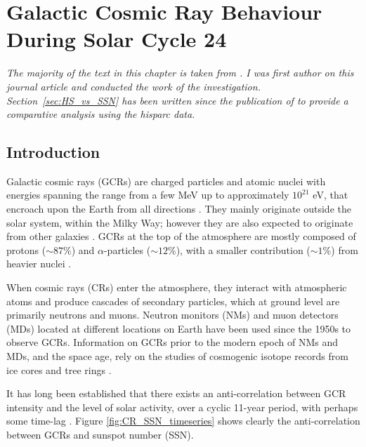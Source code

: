 \chapter{Galactic Cosmic Ray Behaviour During Solar Cycle 24}\label{chap:GCR_SSN_24}


\textit{The majority of the text in this chapter is taken from \cite{ross_behaviour_2019}. I was first author on this journal article and conducted the work of the investigation. Section~\ref{sec:HS_vs_SSN} has been written since the publication of \cite{ross_behaviour_2019} to provide a comparative analysis using the \gls{hisparc} data.}%


\section{Introduction}
\label{S-Introduction} 

Galactic cosmic rays (GCRs) are charged particles and atomic nuclei with energies spanning the range from a few MeV up to approximately $10^{21}$ eV, that encroach upon the Earth from all directions  \citep{giacalone_energetic_2010}. They mainly originate outside the solar system, within the Milky Way; however they are also expected to originate from other galaxies \citep{aab_observation_2017}. GCRs at the top of the atmosphere are mostly composed of protons ($\sim87$\%) and $\alpha$-particles ($\sim12$\%), with a smaller contribution ($\sim1$\%) from heavier nuclei \citep{dunai_cosmic_2010}.

When cosmic rays (CRs) enter the atmosphere, they interact with atmospheric atoms and produce cascades of secondary particles, which at ground level are primarily neutrons and muons. Neutron monitors (NMs) and muon detectors (MDs) located at different locations on Earth have been used since the 1950s to observe GCRs. Information on GCRs prior to the modern epoch of NMs and MDs, and the space age, rely on the studies of cosmogenic isotope records from ice cores and tree rings \citep{owens_heliospheric_2013}.

It has long been established that there exists an anti-correlation between GCR intensity and the level of solar activity, over a cyclic 11-year period, with perhaps some time-lag  \citep{forbush_cosmic-ray_1958, parker_passage_1965, usoskin_correlative_1998, van_allen_modulation_2000}. Figure \ref{fig:CR_SSN_timeseries} shows clearly the anti-correlation between GCRs and sunspot number (SSN).


